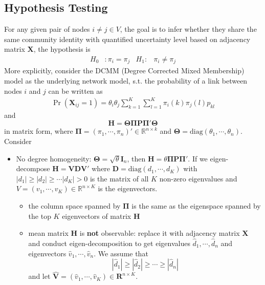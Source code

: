 \documentclass[twoside]{article}
\begin{document}
\subsection{Hypothesis Testing}
For any given pair of nodes $i\neq j\in V$, the goal is to infer whether they share the same community identity with quantified uncertainty level based on adjacency matrix $\mathbf{X}$, the hypothesis is
\begin{align*}
    H_0 &: \pi_i=\pi_j & H_1: &\pi_i\neq \pi_j
\end{align*}
More explicitly, consider the DCMM (Degree Corrected Mixed Membership) model as the underlying network model, s.t. the probability of a link between nodes $i$ and $j$ can be written as 
\begin{align*}
    \Pr(\mathbf{X}_{ij}=1) = \theta_i \theta_j \sum^K_{k=1}\sum^K_{l=1}\pi_i(k)\pi_j(l)p_{kl}
\end{align*}
and 
$$
\mathbf{H} = \boldsymbol{\Theta\Pi}\mathbf{P}\boldsymbol{\Pi'\Theta}
$$
in matrix form, where $\boldsymbol{\Pi} = \left(\pi_1,\cdots,\pi_n\right)'\in \mathbb{R}^{n\times k}$ and $\boldsymbol{\Theta} = \mathrm{diag}\left(\theta_1,\cdots,\theta_n\right)$. Consider 
\begin{itemize}
    \item No degree homogeneity: $\boldsymbol{\Theta} = \sqrt{\theta}\mathbf{I}_n$, then $\mathbf{H} = \theta \boldsymbol{\Pi}\mathbf{P}\boldsymbol{\Pi}'$. If we eigen-decompose $\mathbf{H} = \mathbf{VDV}'$ where $\mathbf{D} = \mathrm{diag}\left(d_1,\cdots,d_K\right)$ with 
    $\left\vert d_1 \right\vert \geq \left\vert d_2 \right\vert \geq \cdots \left\vert d_K \right\vert > 0$ is the matrix of all $K$ non-zero eigenvalues and $V=\left(v_1,\cdots, v_K\right)\in \mathbb{R}^{n\times K}$ is the eigenvectors.
    \begin{itemize}
        \item the column space spanned by $\boldsymbol{\Pi}$ is the same as the eigenspace spanned by the top $K$ eigenvectors of matrix $\mathbf{H}$
        \item mean matrix $\mathbf{H}$ is \textbf{not} observable: replace it with adjacency matrix $\mathbf{X}$ and conduct eigen-decomposition to get eigenvalues $\hat{d}_1,\cdots,\hat{d}_n$ and eigenvectors $\hat{v}_1,\cdots,\hat{v}_n$. We assume that 
        $$ \left\vert \hat{d}_1 \right\vert \geq \left\vert \hat{d}_2 \right\vert \geq \cdots \geq \left\vert \hat{d}_n \right\vert $$
        and let $\hat{\mathbf{V}} = \left(\hat{v}_1,\cdots,\hat{v}_K\right) \in \mathbf{R}^{n\times K}$.
    \end{itemize}
\end{itemize}
\end{document}
